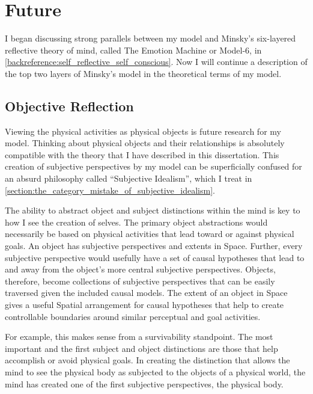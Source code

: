 \chapter{Future}\label{chapter:future}

\label{section:model_6_future_research}

I began discussing strong parallels between my model and Minsky's
six-layered reflective theory of mind, called The Emotion Machine or
Model-6, in \autoref{backreference:self_reflective_self_conscious}.
Now I will continue a description of the top two layers of Minsky's
model in the theoretical terms of my model.

\section{Objective Reflection}
\label{section:objective_reflection}

Viewing the physical activities as physical objects is future research
for my model.  Thinking about physical objects and their relationships
is absolutely compatible with the theory that I have described in this
dissertation.  This creation of subjective perspectives by my model
can be superficially confused for an absurd philosophy called
``Subjective Idealism'', which I treat in
\autoref{section:the_category_mistake_of_subjective_idealism}.

The ability to abstract object and subject distinctions within the
mind is key to how I see the creation of selves.  The primary object
abstractions would necessarily be based on physical activities that
lead toward or against physical goals.  An object has subjective
perspectives and extents in Space.  Further, every subjective
perspective would usefully have a set of causal hypotheses that lead
to and away from the object's more central subjective perspectives.
Objects, therefore, become collections of subjective perspectives that
can be easily traversed given the included causal models.  The extent
of an object in Space gives a useful Spatial arrangement for causal
hypotheses that help to create controllable boundaries around similar
perceptual and goal activities.

For example, this makes sense from a survivability standpoint.  The
most important and the first subject and object distinctions are those
that help accomplish or avoid physical goals.  In creating the
distinction that allows the mind to see the physical body as subjected
to the objects of a physical world, the mind has created one of the
first subjective perspectives, the physical body.

